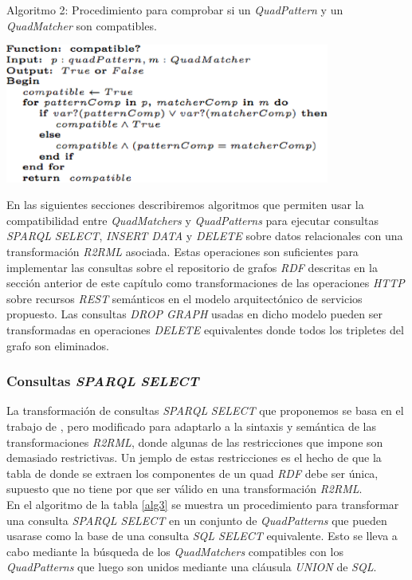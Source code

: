 \begin{table}
\vspace{2.4in}
\caption{Algoritmo 2: Procedimiento para comprobar si un \textit{QuadPattern} y un \textit{QuadMatcher} son compatibles.}
\vspace{5mm}
\includegraphics[width=0.8\textwidth]{algoritmo2}
\label{alg2}
\end{table}

En las siguientes secciones describiremos algoritmos que permiten usar la compatibilidad entre \textit{QuadMatchers} y \textit{QuadPatterns} para ejecutar consultas \textit{SPARQL} \textit{SELECT}, \textit{INSERT DATA} y \textit{DELETE} sobre datos relacionales con una transformaci\'on \textit{R2RML} asociada. Estas operaciones son suficientes para implementar las consultas sobre el repositorio de grafos \textit{RDF} descritas en la secci\'on anterior de este cap\'itulo como transformaciones de las operaciones \textit{HTTP} sobre recursos \textit{REST} sem\'anticos en el modelo arquitect\'onico de servicios propuesto. Las consultas \textit{DROP GRAPH} usadas en dicho modelo pueden ser transformadas en operaciones \textit{DELETE} equivalentes donde todos los tripletes del grafo son eliminados.

\subsubsection{Consultas \textit{SPARQL} \textit{SELECT}}

La transformaci\'on de consultas \textit{SPARQL} \textit{SELECT} que proponemos se basa en el trabajo de \cite{chebotko2009semantics}, pero modificado para adaptarlo a la sintaxis y sem\'antica de las transformaciones \textit{R2RML}, donde algunas de las restricciones que impone \cite{chebotko2009semantics} son demasiado restrictivas. Un jemplo de estas restricciones es el hecho de que la tabla de donde se extraen los componentes de un quad \textit{RDF} debe ser \'unica, supuesto que no tiene por que ser v\'alido en una transformaci\'on \textit{R2RML}.\\
En el algoritmo de la tabla \ref{alg3} se muestra un procedimiento para transformar una consulta \textit{SPARQL SELECT} en un conjunto de \textit{QuadPatterns} que pueden usarase como la base de una consulta \textit{SQL SELECT} equivalente. Esto se lleva a cabo mediante la b\'usqueda de los \textit{QuadMatchers} compatibles con los \textit{QuadPatterns} que luego son unidos mediante una cl\'ausula \textit{UNION} de \textit{SQL}.

